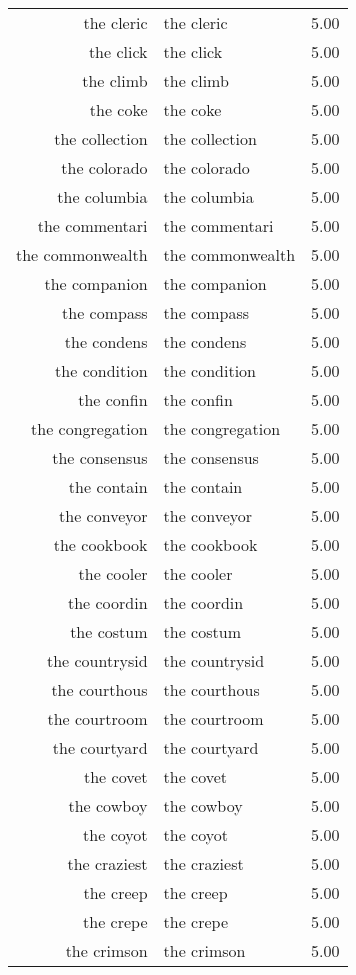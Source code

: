 \begin{table}[ht]
\begin{tabular}{rlr}
  the cleric & the cleric & 5.00 \\ 
  the click & the click & 5.00 \\ 
  the climb & the climb & 5.00 \\ 
  the coke & the coke & 5.00 \\ 
  the collection & the collection & 5.00 \\ 
  the colorado & the colorado & 5.00 \\ 
  the columbia & the columbia & 5.00 \\ 
  the commentari & the commentari & 5.00 \\ 
  the commonwealth & the commonwealth & 5.00 \\ 
  the companion & the companion & 5.00 \\ 
  the compass & the compass & 5.00 \\ 
  the condens & the condens & 5.00 \\ 
  the condition & the condition & 5.00 \\ 
  the confin & the confin & 5.00 \\ 
  the congregation & the congregation & 5.00 \\ 
  the consensus & the consensus & 5.00 \\ 
  the contain & the contain & 5.00 \\ 
  the conveyor & the conveyor & 5.00 \\ 
  the cookbook & the cookbook & 5.00 \\ 
  the cooler & the cooler & 5.00 \\ 
  the coordin & the coordin & 5.00 \\ 
  the costum & the costum & 5.00 \\ 
  the countrysid & the countrysid & 5.00 \\ 
  the courthous & the courthous & 5.00 \\ 
  the courtroom & the courtroom & 5.00 \\ 
  the courtyard & the courtyard & 5.00 \\ 
  the covet & the covet & 5.00 \\ 
  the cowboy & the cowboy & 5.00 \\ 
  the coyot & the coyot & 5.00 \\ 
  the craziest & the craziest & 5.00 \\ 
  the creep & the creep & 5.00 \\ 
  the crepe & the crepe & 5.00 \\ 
  the crimson & the crimson & 5.00 \\ 

\end{tabular}
\end{table}
